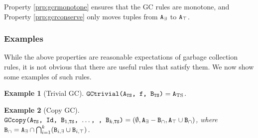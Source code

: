 \documentclass[10pt]{proc}
\numberwithin{equation}{section}
\newtheorem{lemma}[theorem]{Lemma}
\newtheorem{example}{Example}[section]
\newenvironment{proof}[1][Proof]{\begin{trivlist}\item[\hskip \labelsep {\textit {#1:}}]}{\end{trivlist}}
\renewcommand{\tt}[1]{\ifmmode\text{\texttt{#1}}\else\texttt{#1}\fi}
\begin{document}
Property \ref{prp:gcrmonotone} ensures that the GC rules are monotone, and Property \ref{prp:gcrconserve} only moves tuples from $\tt{A}_\exists$ to $\tt{A}_\top$.



\subsubsection{Examples}
While the above properties are reasonable expectations of garbage collection rules, it is not obvious that there are useful rules that satisfy them.
We now show some examples of such rules.

\begin{example}[Trivial GC]
$\tt{GCtrivial(A$_\text{TS}$, f, B$_\text{TS}$)} = \tt{A}_\text{TS}$.
\end{example}

\begin{example}[Copy GC]
$\tt{GCcopy(A$_\text{TS}$, Id, B$_{1,\text{TS}}$, $\dots$, , B$_{k,\text{TS}}$)} = (\emptyset, \tt{A}_\exists - \tt{B}_\cap, \tt{A}_\top \cup \tt{B}_\cap)$, where $\tt{B}_\cap = \tt{A}_\exists \cap \bigcap_{i=1}^k (\tt{B}_{i,\exists} \cup \tt{B}_{i,\top})$.
\end{example}
\end{document}

